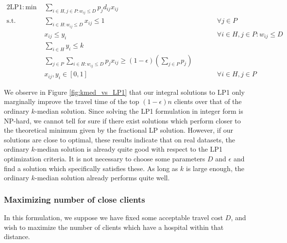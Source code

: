   \begin{alignat}{2}
   \text{LP1}: \text{min }   &  \sum_{i \in H, j \in P: w_{ij} \leq D} p_j d_{ij} x_{ij} \nonumber \\
    \text{s.t.} & \sum_{i \in H: w_{ij} \leq D} x_{ij} \leq 1    &\ & \forall j \in P \\
                             &  x_{ij} \leq y_i      & & \forall i \in H, j \in P: w_{ij} \leq D \\
                             & \sum_{i \in H} y_i \leq k\\                                                          %
& \sum_{j \in P} \sum_{i \in H: w_{ij} \leq D} p_j x_{ij} \geq  (1-\epsilon) \left( \sum_{j \in P}p_j \right) \\
&x_{ij}, y_i \in[0,1] &\qquad & \forall i\in H, j\in P
  \end{alignat}


We observe in Figure \ref{fig:kmed_vs_LP1} that our integral solutions to LP1 only marginally improve the travel time of the top $(1-\epsilon)n$ clients over that of the ordinary $k$-median solution. Since solving the LP1 formulation in integer form is NP-hard, we cannot tell for sure if there exist solutions which perform closer to the theoretical minimum given by the fractional LP solution. However, if our solutions are close to optimal, these results indicate that on real datasets, the ordinary $k$-median solution is already quite good with respect to the LP1 optimization criteria. It is not necessary to choose some parameters $D$ and $\epsilon$ and find a solution which specifically satisfies these. As long as $k$ is large enough, the ordinary $k$-median solution already performs quite well.

\subsubsection{Maximizing number of close clients}


In this formulation, we suppose we have fixed some acceptable travel cost $D$, and wish to maximize the number of clients which have a hospital within that distance. 




